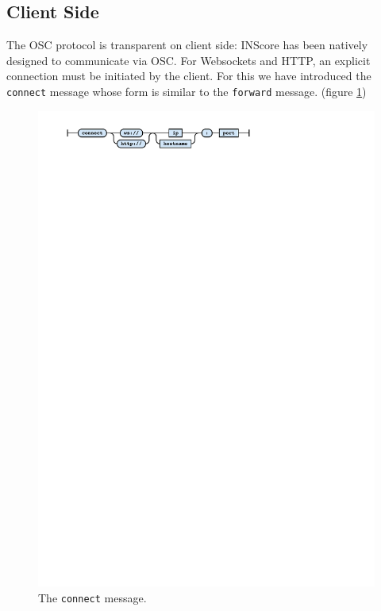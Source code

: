 \documentclass{article}
\newcommand{\icode}[1]	{{\small \texttt{#1}}}
\begin{document}
\subsection{Client Side}\label{sec:client}
The OSC protocol is transparent on client side: INScore has been natively designed to communicate via OSC.
For Websockets and HTTP, an explicit connection must be initiated by the client. 
For this we have introduced the \icode{connect} message whose form is similar to the \icode{forward} message. (figure \ref{fig:connect})
\begin{figure}[h]
\centering
\includegraphics[width=0.98\columnwidth]{rsrc/faust5.pdf}
\caption{The \icode{connect} message.}
\label{fig:connect}
\end{figure}\\




\end{document}
